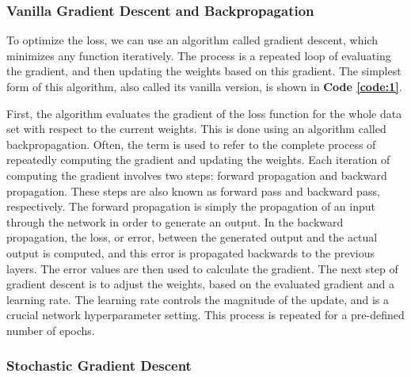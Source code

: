 \subsubsection{Vanilla Gradient Descent and Backpropagation}

\noindent To optimize the loss, we can use an algorithm called gradient descent, which minimizes any function iteratively. The process is a repeated loop of evaluating the gradient, and then updating the weights based on this gradient. The simplest form of this algorithm, also called its vanilla version, is shown in \textbf{Code \ref{code:1}}.


\noindent First, the algorithm evaluates the gradient of the loss function for the whole data set with respect to the current weights. This is done using an algorithm called backpropagation. Often, the term is used to refer to the complete process of repeatedly computing the gradient and updating the weights. Each iteration of computing the gradient involves two steps: forward propagation and backward propagation. These steps are also known as forward pass and backward pass, respectively. The forward propagation is simply the propagation of an input through the network in order to generate an output. In the backward propagation, the loss, or error, between the generated output and the actual output is computed, and this error is propagated backwards to the previous layers. The error values are then used to calculate the gradient. The next step of gradient descent is to adjust the weights, based on the evaluated gradient and a learning rate. The learning rate controls the magnitude of the update, and is a crucial network hyperparameter setting. This process is repeated for a pre-defined number of epochs.

\subsubsection{Stochastic Gradient Descent}

